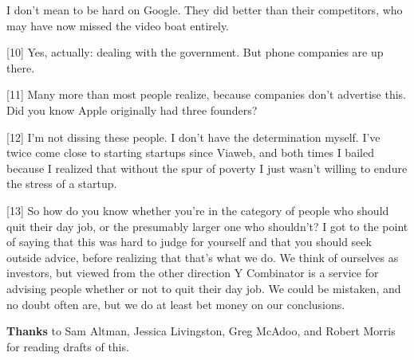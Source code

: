 I don't mean to be hard on Google. They did
                    better than their competitors, who may have now missed the
                    video boat entirely.

[10] Yes, actually: dealing with the government. But phone
                    companies are up there.

[11] Many more than most people realize, because companies
                    don't advertise this. Did you know Apple originally had
                    three founders?

[12] I'm not dissing these people. I don't have the
                    determination myself. I've twice come close to starting
                    startups since Viaweb, and both times I bailed because I
                    realized that without the spur of poverty I just wasn't
                    willing to endure the stress of a startup.

[13] So how do you know whether you're in the category of
                    people who should quit their day job, or the presumably
                    larger one who shouldn't? I got to the point of saying that
                    this was hard to judge for yourself and that you should seek
                    outside advice, before realizing that that's what we do. We
                    think of ourselves as investors, but viewed from the other
                    direction Y Combinator is a service for advising people
                    whether or not to quit their day job. We could be mistaken,
                    and no doubt often are, but we do at least bet money on our
                    conclusions.

\textbf{Thanks} to Sam Altman, Jessica
                    Livingston, Greg McAdoo, and Robert Morris for reading
                    drafts of this.
                    



              
            
          
